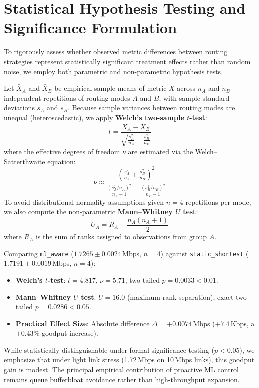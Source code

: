 \section{Statistical Hypothesis Testing and Significance Formulation}
To rigorously assess whether observed metric differences between routing strategies represent statistically significant treatment effects rather than random noise, we employ both parametric and non-parametric hypothesis tests.

Let $\bar{X}_A$ and $\bar{X}_B$ be empirical sample means of metric $X$ across $n_A$ and $n_B$ independent repetitions of routing modes $A$ and $B$, with sample standard deviations $s_A$ and $s_B$. Because sample variances between routing modes are unequal (heteroscedastic), we apply \textbf{Welch's two-sample $t$-test}:
\begin{equation}
  t = \frac{\bar{X}_A - \bar{X}_B}{\sqrt{\frac{s_A^2}{n_A} + \frac{s_B^2}{n_B}}}
\end{equation}
where the effective degrees of freedom $\nu$ are estimated via the Welch--Satterthwaite equation:
\begin{equation}
  \nu \approx \frac{\left( \frac{s_A^2}{n_A} + \frac{s_B^2}{n_B} \right)^2}{\frac{(s_A^2/n_A)^2}{n_A - 1} + \frac{(s_B^2/n_B)^2}{n_B - 1}}
\end{equation}
To avoid distributional normality assumptions given $n=4$ repetitions per mode, we also compute the non-parametric \textbf{Mann--Whitney $U$ test}:
\begin{equation}
  U_A = R_A - \frac{n_A(n_A + 1)}{2}
\end{equation}
where $R_A$ is the sum of ranks assigned to observations from group $A$.

\begin{formulabox}
Comparing \texttt{ml\_aware} ($1.7265 \pm 0.0024$\,Mbps, $n=4$) against \texttt{static\_shortest} ($1.7191 \pm 0.0019$\,Mbps, $n=4$):
\begin{itemize}[noitemsep]
  \item \textbf{Welch's $t$-test}: $t = 4.817$, $\nu = 5.71$, two-tailed $p = 0.0033 < 0.01$.
  \item \textbf{Mann--Whitney $U$ test}: $U = 16.0$ (maximum rank separation), exact two-tailed $p = 0.0286 < 0.05$.
  \item \textbf{Practical Effect Size}: Absolute difference $\Delta = +0.0074$\,Mbps ($+7.4$\,Kbps, a $+0.43\%$ goodput increase).
\end{itemize}
While statistically distinguishable under formal significance testing ($p < 0.05$), we emphasize that under light link stress (1.72\,Mbps on 10\,Mbps links), this goodput gain is modest. The principal empirical contribution of proactive ML control remains queue bufferbloat avoidance rather than high-throughput expansion.
\end{formulabox}


